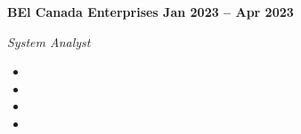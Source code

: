 \vspace{0.1cm}
\textbf{BEl Canada Enterprises \hfill Jan 2023 -- Apr 2023} \par
\textit{System Analyst} \par
\begin{itemize}
	\item
  \item 
  \item 
  \item 
\end{itemize} \par